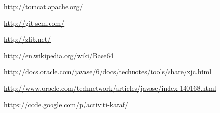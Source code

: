 \documentclass[paper=a4,twoside=false,BCOR=0mm,DIV=calc,fontsize=12pt]{scrartcl}
\begin{document}
\begin{thebibliography}{99}
 \url{http://tomcat.apache.org/}

 \url{http://git-scm.com/}

 \url{http://zlib.net/}

 \url{http://en.wikipedia.org/wiki/Base64}

 \url{http://docs.oracle.com/javase/6/docs/technotes/tools/share/xjc.html}

 \url{http://www.oracle.com/technetwork/articles/javase/index-140168.html}

 \url{https://code.google.com/p/activiti-karaf/}

\end{thebibliography}
\end{document}
